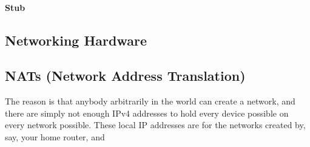 \documentclass[../main.tex]{subfiles}
\begin{document}
\paragraph{Stub}

\label{2:sec:networking_hardware}
\subsection{Networking Hardware}

\label{2:sec:nats}
\subsection{NATs (Network Address Translation)}

The reason is that anybody arbitrarily in the world can create a network, and there are simply not enough IPv4 addresses to hold every device possible on every network possible. These local IP addresses are for the networks created by, say, your home router, and 
\end{document}
